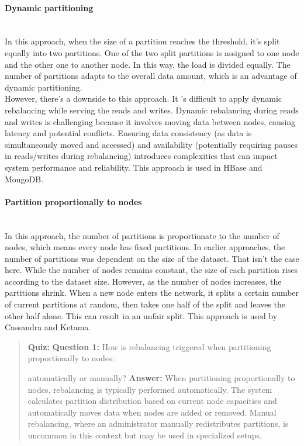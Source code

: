 \paragraph{Dynamic partitioning}\label{_Lo8wHQqBE6TlrOUXAY2i}
\\
In this approach, when the size of a partition reaches the threshold, it's split equally into two partitions. One of the two split partitions is assigned to one node and the other one to another node. In this way, the load is divided equally. The number of partitions adapts to the overall data amount, which is an advantage of dynamic partitioning.
\\
However, there's a downside to this approach. It 's difficult to apply dynamic rebalancing while serving the reads and writes. Dynamic rebalancing during reads and writes is challenging because it involves moving data between nodes, causing latency and potential conflicts. Ensuring data consistency (as data is simultaneously moved and accessed) and availability (potentially requiring pauses in reads/writes during rebalancing) introduces complexities that can impact system performance and reliability. This approach is used in HBase and MongoDB.
\\
\paragraph{Partition proportionally to nodes}\label{2AXEUQKhJ5mI4HIqGeECg}
\\
In this approach, the number of partitions is proportionate to the number of nodes, which means every node has fixed partitions. In earlier approaches, the number of partitions was dependent on the size of the dataset. That isn't the case here. While the number of nodes remains constant, the size of each partition rises according to the dataset size. However, as the number of nodes increases, the partitions shrink. When a new node enters the network, it splits a certain number of current partitions at random, then takes one half of the split and leaves the other half alone. This can result in an unfair split. This approach is used by Cassandra and Ketama.

\begin{quote}
\textbf{Quiz:}
\textbf{Question 1:} How is rebalancing triggered when partitioning proportionally to nodes:

automatically or manually?
\textbf{Answer:} When partitioning proportionally to nodes, rebalancing is typically performed automatically. The system calculates partition distribution based on current node capacities and automatically moves data when nodes are added or removed. Manual rebalancing, where an administrator manually redistributes partitions, is uncommon in this context but may be used in specialized setups.
\end{quote}

